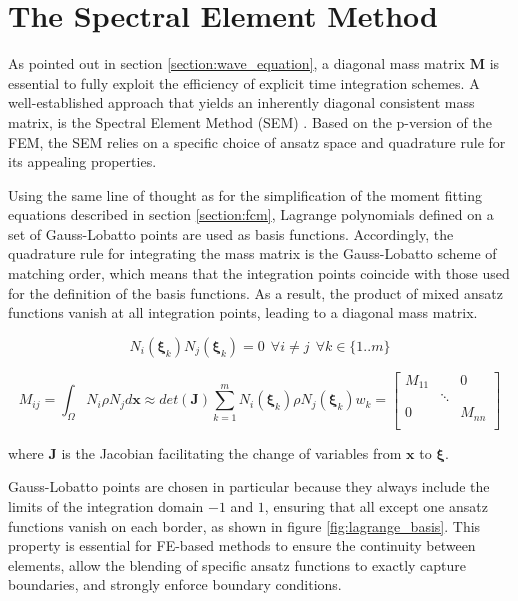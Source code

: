 %
\section{The Spectral Element Method}
\label{section:sem}
%

As pointed out in section \ref{section:wave_equation}, a diagonal mass matrix $\mathbf M$ is essential to fully exploit the efficiency of explicit time integration schemes. A well-established approach that yields an inherently diagonal consistent mass matrix, is the Spectral Element Method (SEM) \cite{Maggio1994}. Based on the p-version of the FEM, the SEM relies on a specific choice of ansatz space and quadrature rule for its appealing properties.

Using the same line of thought as for the simplification of the moment fitting equations described in section \ref{section:fcm}, Lagrange polynomials defined on a set of Gauss-Lobatto points are used as basis functions. Accordingly, the quadrature rule for integrating the mass matrix is the Gauss-Lobatto scheme of matching order, which means that the integration points coincide with those used for the definition of the basis functions. As a result, the product of mixed ansatz functions vanish at all integration points, leading to a diagonal mass matrix.

\begin{equation}
	N_i(\boldsymbol{\xi}_k)N_j(\boldsymbol{\xi}_k) = 0 \ \ \forall i \neq j \ \ \forall k \in \{1..m\}
\end{equation}

\begin{equation}
	M_{ij} = \int_{\Omega} N_i \rho N_j d\mathbf x
	\approx
	det(\mathbf J) \sum_{k=1}^m N_i(\boldsymbol{\xi}_k) \rho N_j(\boldsymbol{\xi}_k) w_k
	=
	\begin{bmatrix}
		M_{11} & & 0 \\
		& \ddots & \\
		0 & & M_{nn} \\
	\end{bmatrix}
\end{equation}

where $\mathbf J$ is the Jacobian facilitating the change of variables from $\mathbf x$ to $\boldsymbol{\xi}$.

Gauss-Lobatto points are chosen in particular because they always include the limits of the integration domain $-1$ and $1$, ensuring that all except one ansatz functions vanish on each border, as shown in figure \ref{fig:lagrange_basis}. This property is essential for FE-based methods to ensure the continuity between elements, allow the blending of specific ansatz functions to exactly capture boundaries, and strongly enforce boundary conditions.

